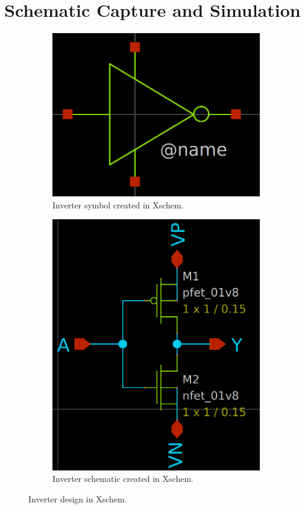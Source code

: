 \documentclass[11pt]{article}
\begin{document}
\section{Schematic Capture and Simulation}
    \begin{figure}[!ht]
        \begin{subfigure}{0.5\linewidth}
            \includegraphics[width=\linewidth]{../img/inverter_sym.png}
            \caption{Inverter symbol created in Xschem.}
        \end{subfigure}
        \begin{subfigure}{0.5\linewidth}
            \includegraphics[width=\linewidth]{../img/inverter_sch.png}
            \caption{Inverter schematic created in Xschem.}
        \end{subfigure}
        \caption{Inverter design in Xschem.}
        \label{fig:inv}
    \end{figure}
\end{document}

